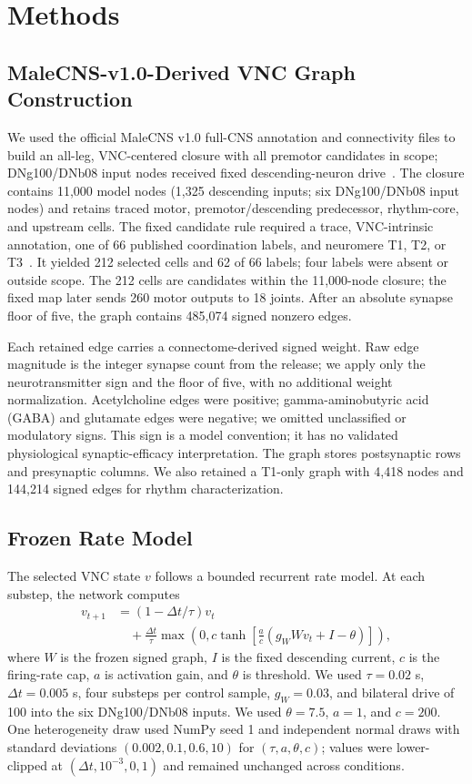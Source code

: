 \documentclass[conference]{IEEEtran}
\begin{document}
\section{Methods}
\label{sec:methods}
\subsection{MaleCNS-v1.0-Derived VNC Graph Construction}
We used the official MaleCNS v1.0 full-CNS annotation and connectivity files to build an all-leg, VNC-centered closure with all premotor candidates in scope; DNg100/DNb08 input nodes received fixed descending-neuron drive~\cite{malecns,takemura2024manc}. The closure contains 11,000 model nodes (1,325 descending inputs; six DNg100/DNb08 input nodes) and retains traced motor, premotor/descending predecessor, rhythm-core, and upstream cells. The fixed candidate rule required a trace, VNC-intrinsic annotation, one of 66 published coordination labels, and neuromere T1, T2, or T3~\cite{cheong2026premotor}. It yielded 212 selected cells and 62 of 66 labels; four labels were absent or outside scope. The 212 cells are candidates within the 11,000-node closure; the fixed map later sends 260 motor outputs to 18 joints. After an absolute synapse floor of five, the graph contains 485,074 signed nonzero edges.

Each retained edge carries a connectome-derived signed weight. Raw edge magnitude is the integer synapse count from the release; we apply only the neurotransmitter sign and the floor of five, with no additional weight normalization. Acetylcholine edges were positive; gamma-aminobutyric acid (GABA) and glutamate edges were negative; we omitted unclassified or modulatory signs. This sign is a model convention; it has no validated physiological synaptic-efficacy interpretation. The graph stores postsynaptic rows and presynaptic columns. We also retained a T1-only graph with 4,418 nodes and 144,214 signed edges for rhythm characterization.

\subsection{Frozen Rate Model}
The selected VNC state $v$ follows a bounded recurrent rate model. At each substep, the network computes
\begin{equation}
  \begin{aligned}
  v_{t+1}&=(1-\Delta t/\tau)v_t\\
  &\quad+\frac{\Delta t}{\tau}\max\left(0,c\tanh\left[
  \frac{a}{c}(g_W Wv_t+I-\theta)\right]\right),
  \end{aligned}
\label{eq:vnc}
\end{equation}
where $W$ is the frozen signed graph, $I$ is the fixed descending current, $c$ is the firing-rate cap, $a$ is activation gain, and $\theta$ is threshold. We used $\tau=0.02$ s, $\Delta t=0.005$ s, four substeps per control sample, $g_W=0.03$, and bilateral drive of 100 into the six DNg100/DNb08 inputs. We used $\theta=7.5$, $a=1$, and $c=200$. One heterogeneity draw used NumPy seed 1 and independent normal draws with standard deviations $(0.002,0.1,0.6,10)$ for $(\tau,a,\theta,c)$; values were lower-clipped at $(\Delta t,10^{-3},0,1)$ and remained unchanged across conditions.
\end{document}
